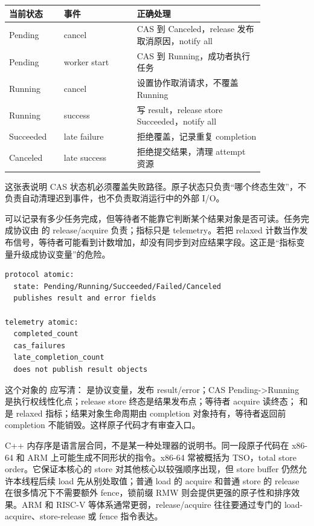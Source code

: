 \begin{center}
\begin{tabular}{p{0.18\linewidth}p{0.24\linewidth}p{0.42\linewidth}}
\toprule
当前状态 & 事件 & 正确处理 \\
\midrule
Pending & cancel & CAS 到 Canceled，release 发布取消原因，notify all \\
Pending & worker start & CAS 到 Running，成功者执行任务 \\
Running & cancel & 设置协作取消请求，不覆盖 Running \\
Running & success & 写 result，release store Succeeded，notify all \\
Succeeded & late failure & 拒绝覆盖，记录重复 completion \\
Canceled & late success & 拒绝提交结果，清理 attempt 资源 \\
\bottomrule
\end{tabular}
\end{center}

这张表说明 CAS 状态机必须覆盖失败路径。原子状态只负责“哪个终态生效”，不负责自动清理迟到事件，也不负责取消运行中的外部 I/O。

 可以记录有多少任务完成，但等待者不能靠它判断某个结果对象是否可读。任务完成协议由  的 release/acquire 负责；指标只是 telemetry。若把 relaxed 计数当作发布信号，等待者可能看到计数增加，却没有同步到对应结果字段。这正是“指标变量升级成协议变量”的危险。

\begin{lstlisting}[numbers=none,caption={completion 中两类 atomic 的边界}]
protocol atomic:
  state: Pending/Running/Succeeded/Failed/Canceled
  publishes result and error fields

telemetry atomic:
  completed_count
  cas_failures
  late_completion_count
  does not publish result objects
\end{lstlisting}

这个对象的  应写清： 是协议变量，发布 result/error；CAS Pending->Running 是执行权线性化点；release store 终态是结果发布点；等待者 acquire 读终态； 和  是 relaxed 指标；结果对象生命周期由 completion 对象持有，等待者返回前 completion 不能销毁。这样原子代码才有审查入口。

C++ 内存序是语言层合同，不是某一种处理器的说明书。同一段原子代码在 x86-64 和 ARM 上可能生成不同形状的指令。x86-64 常被概括为 TSO，total store order。它保证本核心的 store 对其他核心以较强顺序出现，但 store buffer 仍然允许本线程后续 load 先从别处取值；普通 load 的 acquire 和普通 store 的 release 在很多情况下不需要额外 fence，锁前缀 RMW 则会提供更强的原子性和排序效果。ARM 和 RISC-V 等体系通常更弱，release/acquire 往往要通过专门的 load-acquire、store-release 或 fence 指令表达。

